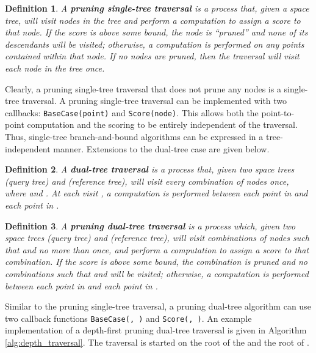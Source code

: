 \documentclass{article}
\newtheorem{defn}{Definition}
\begin{document}
\vspace*{0.4em}
\begin{defn}
A \textbf{pruning single-tree traversal} is a process that, given a space tree,
will visit nodes in the tree and perform a computation to assign a score to that
node.  If the score is above some bound, the node is ``pruned'' and none of its
descendants will be visited; otherwise, a computation is performed on any points
contained within that node.  If no nodes are pruned, then the traversal will
visit each node in the tree once.
\end{defn}
\vspace*{-0.3em}

Clearly, a pruning single-tree traversal that does not prune any nodes is a
single-tree traversal.  A pruning single-tree traversal can be implemented with
two callbacks: \texttt{BaseCase(point)} and \texttt{Score(node)}.  This allows
both the point-to-point computation and the scoring to be entirely independent
of the traversal.  Thus, single-tree branch-and-bound algorithms can be
expressed in a tree-independent manner.  Extensions to the dual-tree case are
given below.

\vspace*{0.4em}
\begin{defn}
A \textbf{dual-tree traversal} is a process that, given two space trees
 (query tree) and  (reference tree), will visit
every combination of nodes  once, where
 and .  At
each visit , a computation is performed between
each point in  and each point in .
\end{defn}


\vspace*{0.2em}
\begin{defn}
\label{def:dtpt}
A \textbf{pruning dual-tree traversal} is a process which, given two space
trees  (query tree) and  (reference
tree), will visit combinations of nodes  such
that  and  no
more than once, and perform a computation to assign a score to that combination.
If the score is above some bound, the combination is pruned and no combinations
 such that  and  will be visited;
otherwise, a computation is performed between each point in  and
each point in .
\end{defn}
\vspace*{-0.3em}

Similar to the pruning single-tree traversal, a pruning dual-tree algorithm can
use two callback functions \texttt{BaseCase(, )} and
\texttt{Score(, )}.  An example implementation of
a depth-first pruning dual-tree traversal is given in
Algorithm \ref{alg:depth_traversal}.  The traversal is started on the root of
the  and the root of .
\end{document}
